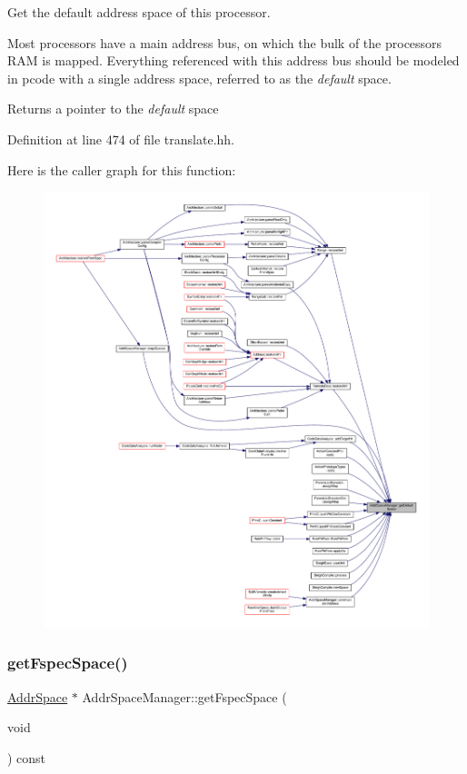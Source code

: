 Get the default address space of this processor. 

Most processors have a main address bus, on which the bulk of the processor\textquotesingle{}s R\+AM is mapped. Everything referenced with this address bus should be modeled in pcode with a single address space, referred to as the {\itshape default} space. \begin{DoxyReturn}{Returns}
a pointer to the {\itshape default} space 
\end{DoxyReturn}


Definition at line 474 of file translate.\+hh.

Here is the caller graph for this function\+:
\nopagebreak
\begin{figure}[H]
\begin{center}
\leavevmode
\includegraphics[width=350pt]{class_addr_space_manager_aec65c9fb56f10199463c70d5b6660b3f_icgraph}
\end{center}
\end{figure}
\mbox{\label{class_addr_space_manager_a734131c0626a1cfbbfd3cb0e93ecba28}} 
\subsubsection{\texorpdfstring{getFspecSpace()}{getFspecSpace()}}
{\footnotesize\ttfamily \mbox{\hyperlink{class_addr_space}{Addr\+Space}} $\ast$ Addr\+Space\+Manager\+::get\+Fspec\+Space (\begin{DoxyParamCaption}\item[{void}]{ }\end{DoxyParamCaption}) const\hspace{0.3cm}{\ttfamily [inline]}}



